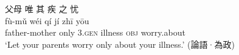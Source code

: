 \documentclass[UTF8, a4paper, oneside, scheme=plain, 12pt]{ctexrep}
\newcommand{\translate}[1]{`#1'}
\newcommand*{\category}[1]{\textsc{#1}}
\begin{document}
\begin{exe}
    \ex
    \glll 父母 唯 其 疾 之 忧 \\
    fù-mǔ wéi qí jí zhī yōu \\
    father-mother only 3.\category{gen} illness \category{obj} worry.about \\
    \glt\translate{Let your parents worry only about your illness.} \hfill (論語·為政)
\end{exe}


\printbibliography[title=References]
\end{document}
